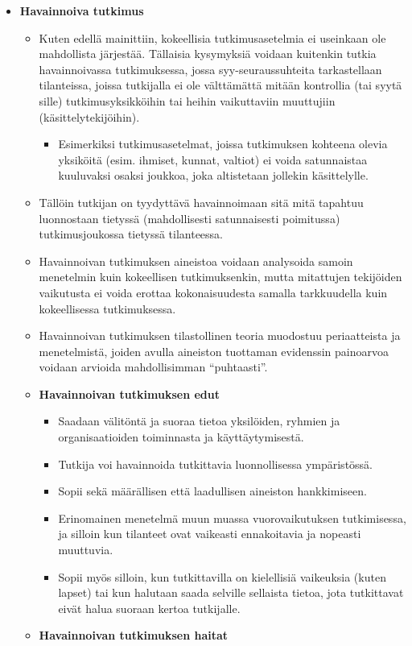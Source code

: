 \documentclass[
]{book}
\providecommand{\tightlist}{%
  \setlength{\itemsep}{0pt}\setlength{\parskip}{0pt}}
\begin{document}
\begin{itemize}
\tightlist
\item
  \textbf{Havainnoiva tutkimus}

  \begin{itemize}
  \tightlist
  \item
    Kuten edellä mainittiin, kokeellisia tutkimusasetelmia ei useinkaan ole mahdollista järjestää. Tällaisia kysymyksiä voidaan kuitenkin tutkia havainnoivassa tutkimuksessa, jossa syy-seuraussuhteita tarkastellaan tilanteissa, joissa tutkijalla ei ole välttämättä mitään kontrollia (tai syytä sille) tutkimusyksikköihin tai heihin vaikuttaviin muuttujiin (käsittelytekijöihin).

    \begin{itemize}
    \tightlist
    \item
      Esimerkiksi tutkimusasetelmat, joissa tutkimuksen kohteena olevia yksiköitä (esim. ihmiset, kunnat, valtiot) ei voida satunnaistaa kuuluvaksi osaksi joukkoa, joka altistetaan jollekin käsittelylle.
    \end{itemize}
  \item
    Tällöin tutkijan on tyydyttävä havainnoimaan sitä mitä tapahtuu luonnostaan tietyssä (mahdollisesti satunnaisesti poimitussa) tutkimusjoukossa tietyssä tilanteessa.
  \item
    Havainnoivan tutkimuksen aineistoa voidaan analysoida samoin menetelmin kuin kokeellisen tutkimuksenkin, mutta mitattujen tekijöiden vaikutusta ei voida erottaa kokonaisuudesta samalla tarkkuudella kuin kokeellisessa tutkimuksessa.
  \item
    Havainnoivan tutkimuksen tilastollinen teoria muodostuu periaatteista ja menetelmistä, joiden avulla aineiston tuottaman evidenssin painoarvoa voidaan arvioida mahdollisimman ``puhtaasti''.
  \item
    \textbf{Havainnoivan tutkimuksen edut}

    \begin{itemize}
    \tightlist
    \item
      Saadaan välitöntä ja suoraa tietoa yksilöiden, ryhmien ja organisaatioiden toiminnasta ja käyttäytymisestä.
    \item
      Tutkija voi havainnoida tutkittavia luonnollisessa ympäristössä.
    \item
      Sopii sekä määrällisen että laadullisen aineiston hankkimiseen.
    \item
      Erinomainen menetelmä muun muassa vuorovaikutuksen tutkimisessa, ja silloin kun tilanteet ovat vaikeasti ennakoitavia ja nopeasti muuttuvia.
    \item
      Sopii myös silloin, kun tutkittavilla on kielellisiä vaikeuksia (kuten lapset) tai kun halutaan saada selville sellaista tietoa, jota tutkittavat eivät halua suoraan kertoa tutkijalle.
    \end{itemize}
  \item
    \textbf{Havainnoivan tutkimuksen haitat}


\end{itemize}
\end{itemize}
\end{document}
